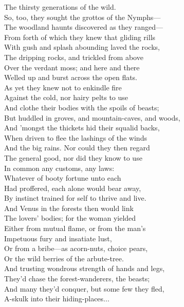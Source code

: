 The thirsty generations of the wild.\\
So, too, they sought the grottos of the Nymphs—\\
The woodland haunts discovered as they ranged—\\
From forth of which they knew that gliding rills\\
With gush and splash abounding laved the rocks,\\
The dripping rocks, and trickled from above\\
Over the verdant moss; and here and there\\
Welled up and burst across the open flats.\\
As yet they knew not to enkindle fire\\
Against the cold, nor hairy pelts to use\\
And clothe their bodies with the spoils of beasts;\\
But huddled in groves, and mountain-caves, and woods,\\
And 'mongst the thickets hid their squalid backs,\\
When driven to flee the lashings of the winds\\
And the big rains. Nor could they then regard\\
The general good, nor did they know to use\\
In common any customs, any laws:\\
Whatever of booty fortune unto each\\
Had proffered, each alone would bear away,\\
By instinct trained for self to thrive and live.\\
And Venus in the forests then would link\\
The lovers' bodies; for the woman yielded\\
Either from mutual flame, or from the man's\\
Impetuous fury and insatiate lust,\\
Or from a bribe—as acorn-nuts, choice pears,\\
Or the wild berries of the arbute-tree.\\
And trusting wondrous strength of hands and legs,\\
They'd chase the forest-wanderers, the beasts;\\
And many they'd conquer, but some few they fled,\\
A-skulk into their hiding-places...

